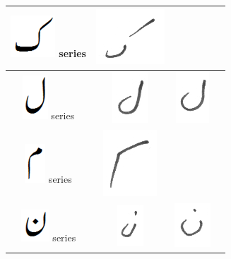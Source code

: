 \documentclass[a4paper,conference]{IEEEtran}
\begin{document}
\begin{table}[h]
\begin{tabular}{@{}cccc@{}}
\hline
\includegraphics[scale=0.15]{kaaf_orig} series & \includegraphics[scale=0.15]{172} & & \\
\hline
\includegraphics[scale=0.15]{Laam_orig} series & \includegraphics[scale=0.15]{173} & \includegraphics[scale=0.15]{174} &  \\
\hline
\includegraphics[scale=0.15]{meem_orig} series & \includegraphics[scale=0.15]{175} & &  \\
\hline
\includegraphics[scale=0.15]{noon_orig} series & \includegraphics[scale=0.15]{176} & \includegraphics[scale=0.15]{177} &  \\

\end{tabular}
\end{table}
\end{document}
